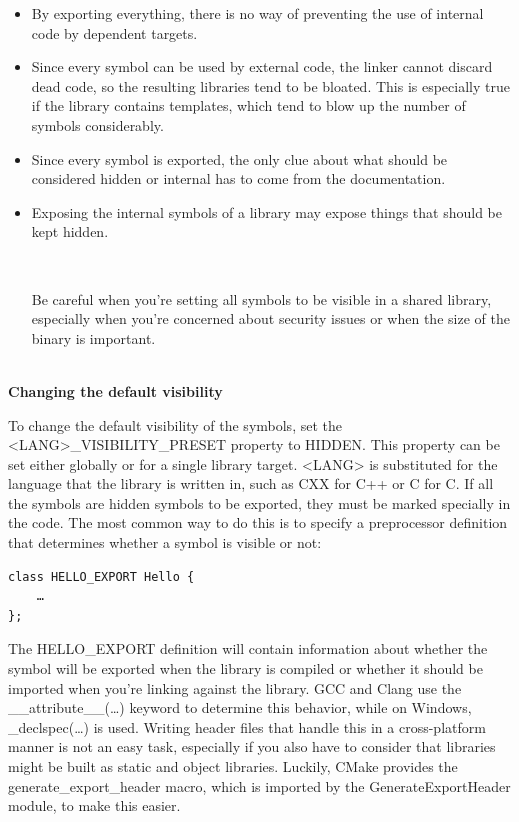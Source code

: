\begin{itemize}
\item 
By exporting everything, there is no way of preventing the use of internal code by dependent targets.

\item 
Since every symbol can be used by external code, the linker cannot discard dead code, so the resulting libraries tend to be bloated. This is especially true if the library contains templates, which tend to blow up the number of symbols considerably.

\item 
Since every symbol is exported, the only clue about what should be considered hidden or internal has to come from the documentation.

\item 
Exposing the internal symbols of a library may expose things that should be kept hidden.

\hspace*{\fill} \\ %
\begin{tcolorbox}[colback=blue!5!white,colframe=blue!75!black,title=Setting All Symbols to Visible]
Be careful when you're setting all symbols to be visible in a shared library, especially when you're concerned about security issues or when the size of the binary is important.
\end{tcolorbox}
\end{itemize}

\hspace*{\fill} \\ %
\noindent
\textbf{Changing the default visibility}

To change the default visibility of the symbols, set the <LANG>\_VISIBILITY\_PRESET property to HIDDEN. This property can be set either globally or for a single library target. <LANG> is substituted for the language that the library is written in, such as CXX for C++ or C for C. If all the symbols are hidden symbols to be exported, they must be marked specially in the code. The most common way to do this is to specify a preprocessor definition that determines whether a symbol is visible or not:

\begin{lstlisting}[style=styleCXX]
class HELLO_EXPORT Hello {
	…
};
\end{lstlisting}

The HELLO\_EXPORT definition will contain information about whether the symbol will be exported when the library is compiled or whether it should be imported when you're linking against the library. GCC and Clang use the \_\_attribute\_\_(…) keyword to determine this behavior, while on Windows, \_declspec(…) is used. Writing header files that handle this in a cross-platform manner is not an easy task, especially if you also have to consider that libraries might be built as static and object libraries. Luckily, CMake provides the generate\_export\_header macro, which is imported by the GenerateExportHeader module, to make this easier.

